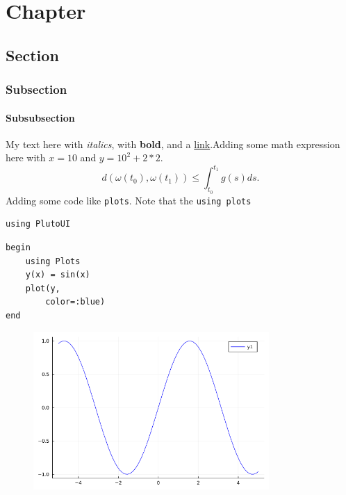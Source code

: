 \newpage

\chapter{Chapter}

\section{Section}

\subsection{Subsection}

\subsubsection{Subsubsection}
My text here with \textit{italics}, with \textbf{bold}, and a  \href{https://davibarreira.github.io/}{link}.Adding some math expression here with $x=10$ and $y = 10^2 + 2*2$.
\begin{displaymath}
	d(\omega(t_0),\omega(t_1)) \leq \int^{t_1}_{t_0}g(s) ds.
\end{displaymath}
Adding some code like \lstinline[style=julia]{plots}. Note that the \lstinline[style=julia]{using plots}
\begin{lstlisting}[language=JuliaLocal, style=julia]
using PlutoUI
\end{lstlisting}

\begin{lstlisting}[language=JuliaLocal, style=julia]
begin
	using Plots
	y(x) = sin(x)
	plot(y,
		color=:blue)
end
\end{lstlisting}

\begin{figure}[H]
	\centering
	\includegraphics[width=0.8\textwidth]{./figures/examplepluto_figure1.png}
	\label{fig:examplepluto_figure1.png}

\end{figure}

